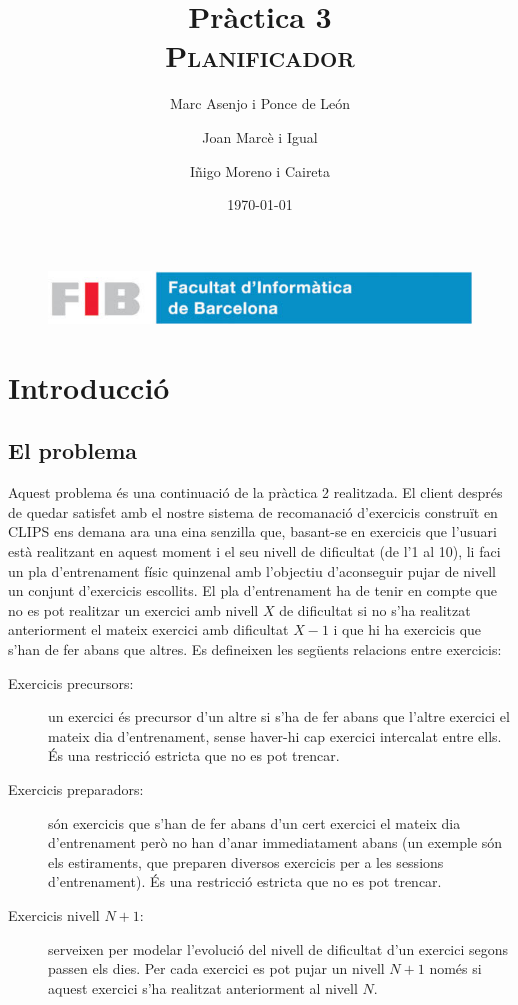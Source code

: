 \documentclass[a4paper,12pt, UTF-8]{article}
\title{
	\Huge
	\textbf{Pràctica 3} \\ 
	\scshape Planificador
}
\author{
	Marc Asenjo i Ponce de León \and
	Joan Marcè i Igual \and
	Iñigo Moreno i Caireta
}
\date{\today}
\begin{document}
\maketitle

\begin{figure}
	\centering
	\includegraphics[width=0.8\linewidth]{./simple_FIB}
\end{figure}

\newpage

\tableofcontents

\newpage

\section{Introducció}

\subsection{El problema}

Aquest problema és una continuació de la pràctica 2 realitzada. El client després de quedar satisfet amb el nostre sistema de recomanació d'exercicis construït en CLIPS ens demana ara una eina senzilla que, basant-se en exercicis que l'usuari està realitzant en aquest moment i el seu nivell de dificultat (de l'1 al 10), li faci un pla d'entrenament físic quinzenal amb l'objectiu d'aconseguir pujar de nivell un conjunt d'exercicis escollits. El pla d'entrenament ha de tenir en compte que no es pot realitzar un exercici amb nivell $X$ de dificultat si no s'ha realitzat anteriorment el mateix exercici amb dificultat $X - 1$ i que hi ha exercicis que s'han de fer abans que altres. Es defineixen les següents relacions entre exercicis:

\begin{description}
	\item[Exercicis precursors:] un exercici és precursor d'un altre si s'ha de fer abans que l'altre exercici el mateix dia d'entrenament, sense haver-hi cap exercici intercalat entre ells. És una restricció estricta que no es pot trencar.
	\item[Exercicis preparadors:] són exercicis que s'han de fer abans d'un cert exercici el mateix dia d'entrenament però no han d'anar immediatament abans (un exemple són els estiraments, que preparen diversos exercicis per a les sessions d'entrenament). És una restricció estricta que no es pot trencar.
	\item[Exercicis nivell $N + 1$:] serveixen per modelar l'evolució del nivell de dificultat d'un exercici segons passen els dies. Per cada exercici es pot pujar un nivell $N + 1$ només si aquest exercici s'ha realitzat anteriorment al nivell $N$.
\end{description}
\end{document}
